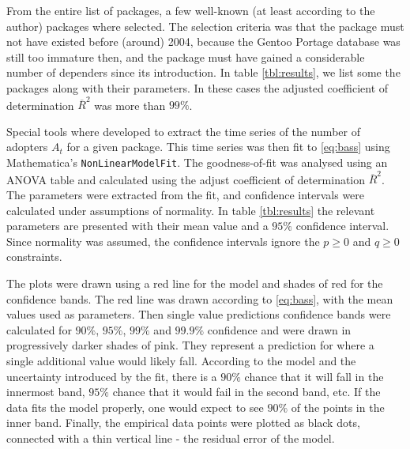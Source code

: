 \documentclass[smallextended,final]{svjour3}
\begin{document}

From the entire list of packages, a few well-known (at least according to the author) packages where selected. The selection criteria was that the package must not have existed before (around) 2004, because the Gentoo Portage database was still too immature then, and the package must have gained a considerable number of dependers since its introduction. In table \ref{tbl:results}, we list some the packages along with their parameters. In these cases the adjusted coefficient of determination $\overline{R}^2$ was more than $99\%$.

Special tools where developed to extract the time series of the number of adopters $A_t$ for a given package. This time series was then fit to \eqref{eq:bass} using Mathematica's \texttt{NonLinearModelFit}. The goodness-of-fit was analysed using an ANOVA table and calculated using the adjust coefficient of determination $\overline{R}^2$. The parameters were extracted from the fit, and confidence intervals were calculated under assumptions of normality. In table \ref{tbl:results} the relevant parameters are presented with their mean value and a $95\%$ confidence interval. Since normality was assumed, the confidence intervals ignore the $p \ge 0$ and $q \ge 0$ constraints. 

The plots were drawn using a red line for the model and shades of red for the confidence bands. The red line was drawn according to \eqref{eq:bass}, with the mean values used as parameters. Then single value predictions confidence bands were calculated for $90\%$, $95\%$, $99\%$ and $99.9\%$ confidence and were drawn in progressively darker shades of pink. They represent a prediction for where a single additional value would likely fall. According to the model and the uncertainty introduced by the fit, there is a $90\%$ chance that it will fall in the innermost band, $95\%$ chance that it would fail in the second band, etc. If the data fits the model properly, one would expect to see $90\%$ of the points in the inner band. Finally, the empirical data points were plotted as black dots, connected with a thin vertical line - the residual error of the model.
\end{document}
